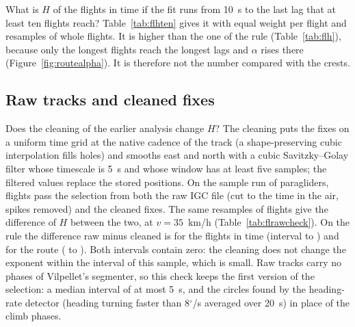 What is $H$ of the flights in time if the fit runs from 10~s to the last lag that at least ten flights reach? Table~\ref{tab:flhten} gives it with equal weight per flight and \flNBoot{} resamples of whole flights. It is higher
than the one of the rule (Table~\ref{tab:flh}), because only the longest flights reach the longest lags and $\alpha$ rises there (Figure~\ref{fig:routealpha}). It is therefore not the number compared with the crests.

\begin{table}[H]
\centering
\caption{$H$ of the flights in time fitted from 10~s to the last lag with at least ten flights, with 95\% intervals.}
\label{tab:flhten}
\small

\end{table}

\subsection{Raw tracks and cleaned fixes}\label{sec:flraw}

Does the cleaning of the earlier analysis change $H$? The cleaning puts the fixes on a uniform time grid at the native cadence of the track (a shape-preserving cubic interpolation fills holes) and smooths east and north with a cubic
Savitzky--Golay filter whose timescale is 5~s and whose window has at least five samples; the filtered values replace the stored positions. On the sample run of \flRawNInSample{} paragliders, \flRawNBoth{} flights pass the selection from both
the raw IGC file (cut to the time in the air, spikes removed) and the cleaned fixes. The same resamples of flights give the difference of $H$ between the two, at $v = 35$~km/h (Table~\ref{tab:flrawcheck}). On the rule the difference raw
minus cleaned is \flRawDynRule{} for the flights in time (interval \flRawDynRuleLo{} to \flRawDynRuleHi) and \flRawRouteRule{} for the route (\flRawRouteRuleLo{} to \flRawRouteRuleHi). Both intervals contain zero: the cleaning does not change the
exponent within the interval of this sample, which is small. Raw tracks carry no phases of Vilpellet's segmenter, so this check keeps the first version of the selection: a median interval of at most 5~s, and the circles found by the heading-rate detector (heading turning faster than 8$^\circ$/s averaged over 20~s) in place of the climb phases.

\begin{table}[H]
\centering
\caption{$H$ of the same \flRawNBoth{} flights from the raw IGC files and from the cleaned fixes, and the difference, with 95\% intervals from the same resamples of flights.}
\label{tab:flrawcheck}
\footnotesize
\setlength{\tabcolsep}{3pt}

\end{table}

